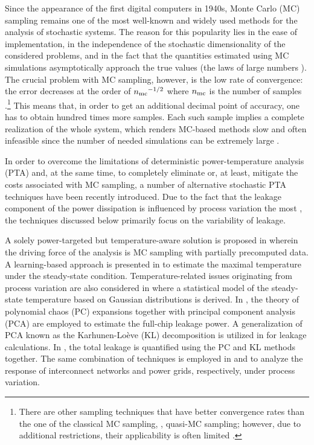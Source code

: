 Since the appearance of the first digital computers in 1940s, Monte Carlo (MC) sampling remains one of the most well-known and widely used methods for the analysis of stochastic systems.
The reason for this popularity lies in the ease of implementation, in the independence of the stochastic dimensionality of the considered problems, and in the fact that the quantities estimated using MC simulations asymptotically approach the true values (the laws of large numbers \cite{durrett2010}).
The crucial problem with MC sampling, however, is the low rate of convergence: the error decreases at the order of ${n_\text{mc}}^{-1/2}$ where ${n_\text{mc}}$ is the number of samples \cite{xiu2010, maitre2010}.\footnote{There are other sampling techniques that have better convergence rates than the one of the classical MC sampling, \eg, quasi-MC sampling; however, due to additional restrictions, their applicability is often limited \cite{xiu2010}.}
This means that, in order to get an additional decimal point of accuracy, one has to obtain hundred times more samples.
Each such sample implies a complete realization of the whole system, which renders MC-based methods slow and often infeasible since the number of needed simulations can be extremely large \cite{diaz-emparanza2002}.

In order to overcome the limitations of deterministic power-temperature analysis (PTA) and, at the same time, to completely eliminate or, at least, mitigate the costs associated with MC sampling, a number of alternative stochastic PTA techniques have been recently introduced.
Due to the fact that the leakage component of the power dissipation is influenced by process variation the most \cite{chandrakasan2001, srivastava2010, juan2011, juan2012}, the techniques discussed below primarily focus on the variability of leakage.

A solely power-targeted but temperature-aware solution is proposed in \cite{chandra2010} wherein the driving force of the analysis is MC sampling with partially precomputed data.
A learning-based approach is presented in \cite{juan2011} to estimate the maximal temperature under the steady-state condition.
Temperature-related issues originating from process variation are also considered in \cite{juan2012} where a statistical model of the steady-state temperature based on Gaussian distributions is derived.
In \cite{shen2009}, the theory of polynomial chaos (PC) expansions \cite{xiu2010, maitre2010, ghanem1991} together with principal component analysis (PCA) are employed to estimate the full-chip leakage power.
A generalization of PCA known as the Karhunen-Lo\`{e}ve (KL) decomposition \cite{xiu2010, maitre2010, ghanem1991} is utilized in \cite{bhardwaj2006} for leakage calculations.
In \cite{bhardwaj2008}, the total leakage is quantified using the PC and KL methods together.
The same combination of techniques is employed in \cite{vrudhula2006} and \cite{ghanta2006} to analyze the response of interconnect networks and power grids, respectively, under process variation.

